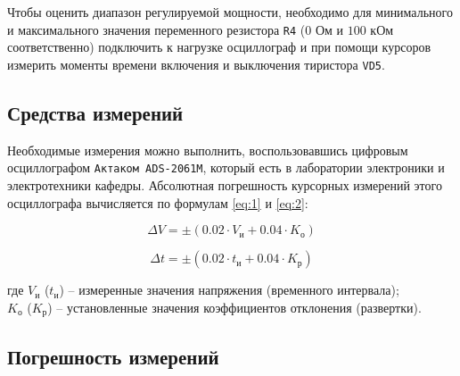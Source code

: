 Чтобы оценить диапазон регулируемой мощности, необходимо для минимального и максимального значения переменного резистора \verb+R4+ ($0$ Ом и $100$ кОм соответственно) подключить к нагрузке осциллограф и при помощи курсоров измерить моменты времени включения и выключения тиристора \verb+VD5+.

\subsection{Средства измерений}

Необходимые измерения можно выполнить, воспользовавшись цифровым осциллографом \verb+Актаком ADS-2061M+, который есть в лаборатории электроники и электротехники кафедры. Абсолютная погрешность курсорных измерений этого осциллографа вычисляется по формулам \ref{eq:1} и \ref{eq:2}:

\begin{equation}
\label{eq:1}
	\Delta V = \pm \left(0.02 \cdot V_{\text{и}} + 0.04 \cdot K_{\text{о}} \right)
\end{equation}

\begin{equation}
\label{eq:2}
	\Delta t = \pm \left(0.02 \cdot t_{\text{и}} + 0.04 \cdot K_{\text{р}} \right)
\end{equation}

где $V_{\text{и}}$ ($t_{\text{и}}$) -- измеренные значения напряжения (временного интервала);\\ $K_{\text{о}}$ ($K_{\text{р}}$) -- установленные значения коэффициентов отклонения (развертки).

\subsection{Погрешность измерений}


